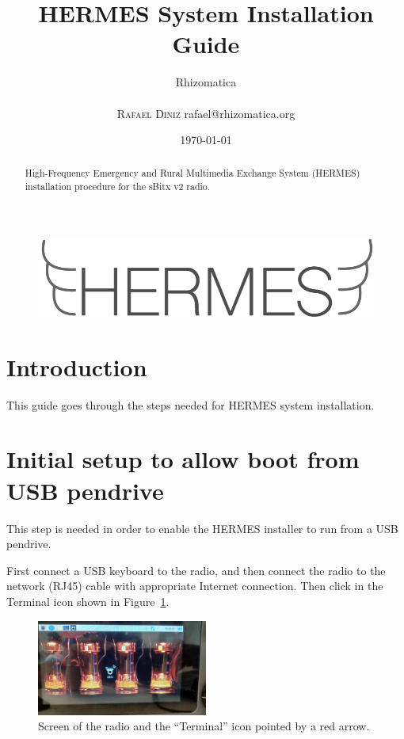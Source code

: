 \documentclass[11pt,a4paper]{article}
\title{HERMES System Installation Guide}
\author{
       \large
       \mbox{Rhizomatica} \\
       \mbox{}\\ 
       \textsc{Rafael Diniz}
        rafael@rhizomatica.org\\
}
\date{\today}
\begin{document}
\maketitle

\begin{figure}[!ht]
\includegraphics[width=1\textwidth]{pictures/logoh.png}
\end{figure}

\begin{abstract}

  High-Frequency Emergency and Rural Multimedia Exchange System (HERMES) installation procedure for the sBitx v2 radio.

\end{abstract}


\tableofcontents

\setlength{\parindent}{0em}
\setlength{\parskip}{1em}

\section{Introduction}

This guide goes through the steps needed for HERMES system installation.


\section{Initial setup to allow boot from USB pendrive}

This step is needed in order to enable the HERMES installer to run from a USB pendrive.

First connect a USB keyboard to the radio, and then connect the radio to the network (RJ45) cable with appropriate Internet connection.
Then click in the Terminal icon shown in Figure~\ref{fig:terminal}.

\begin{figure}[!ht]
  \centering
  \includegraphics[width=0.5\textwidth]{pictures/screen1-edited.jpeg}
  \caption{Screen of the radio and the ``Terminal'' icon pointed by a red arrow.}
  \label{fig:terminal}
\end{figure}
\end{document}

